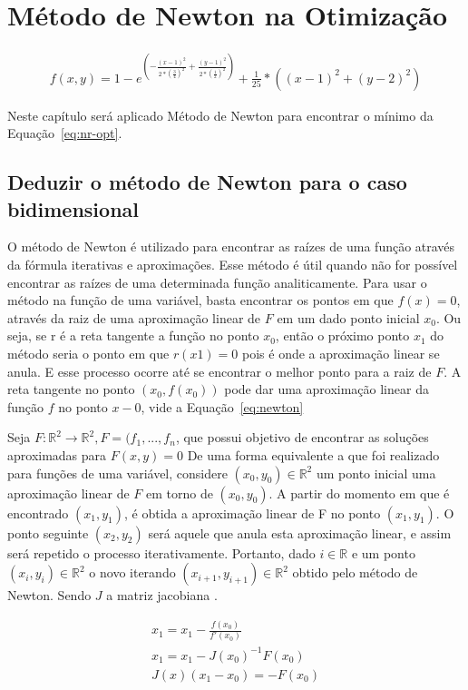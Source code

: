 \section{Método de Newton na Otimização}

\begin{equation} \label{eq:nr-opt}
\begin{split}
    f(x,y) = 1 - 
    e^{\left( - 
        \frac{(x-1)^2}{2*(\frac{3}{4})^2}
        +
        \frac{(y-1)^2}{2*(\frac{1}{2})^2}
    \right)}
    + \frac{1}{25} * \left(  (x-1)^2 + (y - 2)^2 \right)
\end{split}
\end{equation}

Neste capítulo será aplicado Método de Newton para encontrar o mínimo da Equação~\ref{eq:nr-opt}.

\subsection{Deduzir o método de Newton para o caso bidimensional}

O método de Newton é utilizado para encontrar as raízes de uma função através da fórmula iterativas e aproximações. 
Esse método é útil quando não for possível encontrar as raízes de uma determinada função analiticamente.
Para usar o método na função de uma variável, basta encontrar os pontos em que $f(x) = 0$, através da raiz de uma aproximação linear de $F$ em um dado ponto inicial $x_0$. Ou seja, se r é a reta tangente a função no ponto $x_0$, então o próximo ponto $x_1$ do método seria o ponto em que $r(x1) = 0$ pois é onde a aproximação linear se anula. E esse processo ocorre até se encontrar o melhor ponto para a raiz de $F$. 
A reta tangente no ponto  $(x_0, f(x_0))$ pode dar uma aproximação linear da função $f$ no ponto $x-0$, vide a Equação~\ref{eq:newton}\cite{ruggiero2000calculo}

Seja $F : \mathbb{R}^2 \to \mathbb{R}^2, F = (f_1, ... , f_n $,   que possui objetivo de encontrar as soluções aproximadas para $F(x,y) = 0$ 
De uma forma equivalente a que foi realizado para funções de uma variável, considere $(x_0, y_0) \in \mathbb{R}^2$ um ponto inicial uma
aproximação linear de $F$ em torno de $(x_0, y_0)$.
A partir do momento em que é encontrado $(x_1, y_1)$, é obtida a aproximação linear de F no ponto $(x_1, y_1)$. O ponto seguinte $(x_2, y_2)$ será aquele que anula esta aproximação linear, e assim será repetido o processo iterativamente. 
Portanto, dado $i \in \mathbb{R}$ e um ponto $(x_i, y_i) \in \mathbb{R}^2$ o novo iterando $(x_{i+1}, y_{i+1}) \in \mathbb{R}^2$ obtido pelo método de Newton. Sendo $J$ a matriz jacobiana
\cite{ruggiero2000calculo}.

\begin{equation} \label{eq:newton}
\begin{split}
    x_{1} = x_1 - \frac{f(x_0)}{f'(x_0)} 
    \\
    x_{1} = x_1 -J(x_0)^{-1} F(x_0)
    \\
    J(x)(x_1- x_0) = -F(x_0) 
\end{split}
\end{equation}



